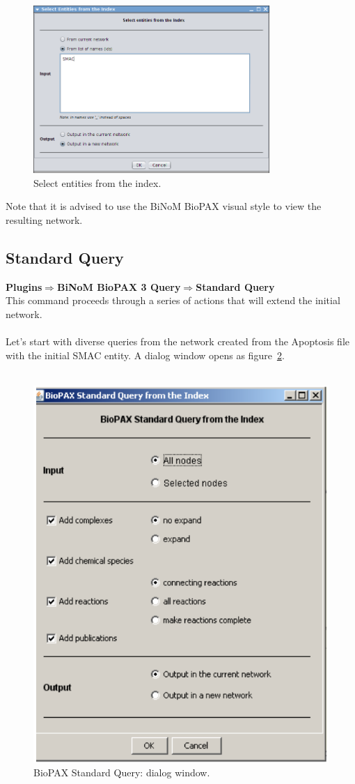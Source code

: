 \begin{figure}
\centering
\includegraphics[width=0.8\textwidth]{graphics/ebo_select_entities_from_the_index}
\caption{Select entities from the index.}
\label{Select_entities_from_index}
\end{figure}

Note that it is advised to use the BiNoM BioPAX visual style to view the resulting network.

\subsection{Standard Query}
\textbf{Plugins$\Rightarrow$BiNoM BioPAX 3 Query$\Rightarrow$Standard Query}\\

This command proceeds through a series of actions that will extend the initial
network.\\\\
Let’s start with diverse queries from the network created from the Apoptosis
file with the initial SMAC entity. A dialog window opens as
figure~\ref{Standard_Query_Dialog}.\\\\

\begin{figure}
\centering
\includegraphics[width=.5\textwidth]{graphics/Standard_Query_Dialog}
\caption{BioPAX Standard Query: dialog window.}
\label{Standard_Query_Dialog}
\end{figure}

